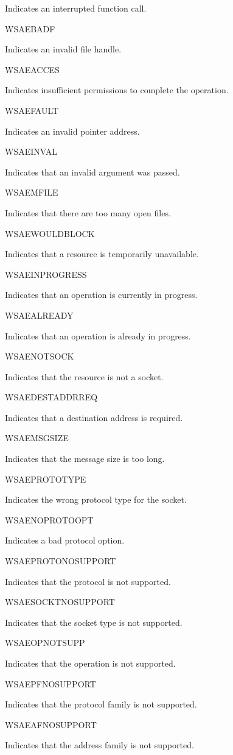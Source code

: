 Indicates an interrupted function call.

WSAEBADF

Indicates an invalid file handle.

WSAEACCES

Indicates insufficient permissions to complete the operation.

WSAEFAULT

Indicates an invalid pointer address.

WSAEINVAL

Indicates that an invalid argument was passed.

WSAEMFILE

Indicates that there are too many open files.

WSAEWOULDBLOCK

Indicates that a resource is temporarily unavailable.

WSAEINPROGRESS

Indicates that an operation is currently in progress.

WSAEALREADY

Indicates that an operation is already in progress.

WSAENOTSOCK

Indicates that the resource is not a socket.

WSAEDESTADDRREQ

Indicates that a destination address is required.

WSAEMSGSIZE

Indicates that the message size is too long.

WSAEPROTOTYPE

Indicates the wrong protocol type for the socket.

WSAENOPROTOOPT

Indicates a bad protocol option.

WSAEPROTONOSUPPORT

Indicates that the protocol is not supported.

WSAESOCKTNOSUPPORT

Indicates that the socket type is not supported.

WSAEOPNOTSUPP

Indicates that the operation is not supported.

WSAEPFNOSUPPORT

Indicates that the protocol family is not supported.

WSAEAFNOSUPPORT

Indicates that the address family is not supported.

